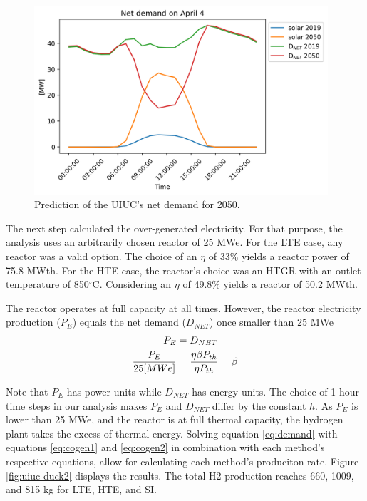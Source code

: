 \begin{figure}[htbp!]
	\centering
	\includegraphics[height=7cm]{figures-hydro/uiuc-duck}
	\hfill
	\caption{Prediction of the UIUC's net demand for 2050.}
	\label{fig:uiuc-duck1}
\end{figure}

The next step calculated the over-generated electricity.
For that purpose, the analysis uses an arbitrarily chosen reactor of 25 MWe.
For the LTE case, any reactor was a valid option.
The choice of an $\eta$ of 33$\%$ yields a reactor power of 75.8 MWth.
For the \gls{HTE} case, the reactor's choice was an HTGR with an outlet temperature of 850$^{\circ}$C.
Considering an $\eta$ of 49.8$\%$ yields a reactor of 50.2 MWth.

The reactor operates at full capacity at all times.
However, the reactor electricity production ($P_{E}$) equals the net demand ($D_{NET}$) once smaller than 25 MWe
\begin{align}
	P_{E} &= D_{NET}  \notag \\
  	\frac{P_E}{25 [MWe]} &= \frac{\eta \beta P_{th}}{\eta P_{th}} = \beta \label{eq:demand}
\end{align}

Note that $P_{E}$ has power units while $D_{NET}$ has energy units.
The choice of 1 hour time steps in our analysis makes $P_{E}$ and $D_{NET}$ differ by the constant $h$.
As $P_{E}$ is lower than 25 MWe, and the reactor is at full thermal capacity, the hydrogen plant takes the excess of thermal energy.
Solving equation \ref{eq:demand} with equations \ref{eq:cogen1} and \ref{eq:cogen2} in combination with each method's respective equations, allow for calculating each method's produciton rate.
Figure \ref{fig:uiuc-duck2} displays the results.
The total \gls{H2} production reaches 660, 1009, and 815 kg for \gls{LTE}, \gls{HTE}, and \gls{SI}.

